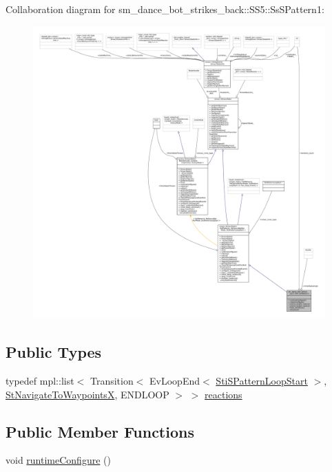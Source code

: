 Collaboration diagram for sm\+\_\+dance\+\_\+bot\+\_\+strikes\+\_\+back\+:\+:S\+S5\+:\+:Ss\+S\+Pattern1\+:
\nopagebreak
\begin{figure}[H]
\begin{center}
\leavevmode
\includegraphics[width=350pt]{structsm__dance__bot__strikes__back_1_1SS5_1_1SsSPattern1__coll__graph}
\end{center}
\end{figure}
\subsection*{Public Types}
\begin{DoxyCompactItemize}
\item 
typedef mpl\+::list$<$ Transition$<$ Ev\+Loop\+End$<$ \hyperlink{structsm__dance__bot__strikes__back_1_1s__pattern__states_1_1StiSPatternLoopStart}{Sti\+S\+Pattern\+Loop\+Start} $>$, \hyperlink{structsm__dance__bot__strikes__back_1_1StNavigateToWaypointsX}{St\+Navigate\+To\+WaypointsX}, E\+N\+D\+L\+O\+OP $>$ $>$ \hyperlink{structsm__dance__bot__strikes__back_1_1SS5_1_1SsSPattern1_a077ab9e3328529d25438003716310822}{reactions}
\end{DoxyCompactItemize}
\subsection*{Public Member Functions}
\begin{DoxyCompactItemize}
\item 
void \hyperlink{structsm__dance__bot__strikes__back_1_1SS5_1_1SsSPattern1_afe83fea063a0ffdab1e06a5ef5a518e1}{runtime\+Configure} ()
\end{DoxyCompactItemize}

